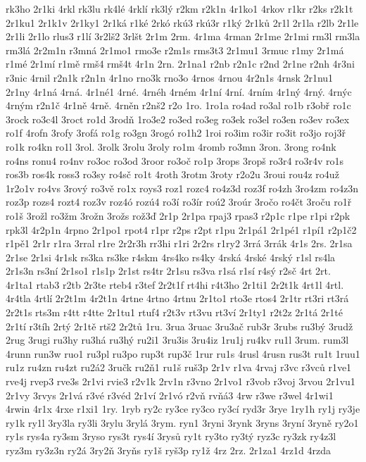 rk3ho
2r1ki
4rkl
rk3lu
rk4lé
4rklí
rk3lý
r2km
r2k1n
4r1ko1
4rkov
r1kr
r2ks
r2k1t
2r1ku1
2r1k1v
2r1ky1
2r1ká
r1ké
2rkó
rkú3
rkú3r
r1ký
2r1ků
2r1l
2r1la
r2lb
2r1le
2r1li
2r1lo
rlus3
r1lí
3r2lš2
3rlšt
2r1m
2rm.
4r1ma
4rman
2r1me
2r1mi
rm3l
rm3la
rm3lá
2r2m1n
r3mná
2r1mo1
rmo3e
r2m1s
rms3t3
2r1mu1
3rmuc
r1my
2r1má
r1mé
2r1mí
r1mě
rmš4
rmš4t
4r1n
2rn.
2r1na1
r2nb
r2n1c
r2nd
2r1ne
r2nh
4r3ni
r3nic
4rnil
r2n1k
r2n1n
4r1no
rno3k
rno3o
4rnos
4rnou
4r2n1s
4rnsk
2r1nu1
2r1ny
4r1ná
4rná.
4r1né1
4rné.
4rnéh
4rném
4r1ní
4rní.
4rním
4r1ný
4rný.
4rnýc
4rným
r2n1č
4r1ně
4rně.
4rněn
r2nš2
r2o
1ro.
1ro1a
ro4ad
ro3al
ro1b
r3obř
ro1c
3rock
ro3c4l
3roct
ro1d
3rodň
1ro3e2
ro3ed
ro3eg
ro3ek
ro3el
ro3en
ro3ev
ro3ex
ro1f
4rofn
3rofy
3rofá
ro1g
ro3gn
3rogó
ro1h2
1roi
ro3im
ro3ir
ro3it
ro3jo
roj3ř
ro1k
ro4kn
ro1l
3rol.
3rolk
3rolu
3roly
ro1m
4romb
ro3mn
3ron.
3rong
ro4nk
ro4ns
ronu4
ro4nv
ro3oc
ro3od
3roor
ro3oč
ro1p
3rops
3ropš
ro3r4
ro3r4v
ro1s
ros3b
ros4k
ross3
ro3sy
ro4sč
ro1t
4roth
3rotm
3roty
r2o2u
3roui
rou4z
ro4už
1r2o1v
ro4vs
3rový
ro3vě
ro1x
roys3
roz1
rozc4
ro4z3d
roz3f
ro4zh
3ro4zm
ro4z3n
roz3p
rozs4
rozt4
roz3v
roz4ó
rozú4
ro3í
ro3ír
roú2
3roúr
3ročo
ro4čt
3roču
ro1ř
ro1š
3rožl
ro3žm
3rožn
3rožs
rož3ď
2r1p
2r1pa
rpaj3
rpas3
r2p1c
r1pe
r1pi
r2pk
rpk3l
4r2p1n
4rpno
2r1po1
rpot4
r1pr
r2ps
r2pt
r1pu
2r1pá1
2r1pé1
r1pí1
r2p1č2
r1pě1
2r1r
r1ra
3rral
r1re
2r2r3h
rr3hi
r1ri
2r2rs
r1ry2
3rrá
3rrák
4r1s
2rs.
2r1sa
2r1se
2r1si
4r1sk
rs3ka
rs3ke
r4skm
4rs4ko
rs4ky
4rská
4rské
4rský
r1sl
rs4la
2r1s3n
rs3ní
2r1so1
r1s1p
2r1st
rs4tr
2r1su
rs3va
r1sá
r1sí
r4sý
r2sč
4rt
2rt.
4r1ta1
rtab3
r2tb
2r3te
rteb4
r3tef
2r2t1f
rt4hi
r4t3ho
2r1ti1
2r2t1k
4rt1l
4rtl.
4r4tla
4rtlí
2r2t1m
4r2t1n
4rtne
4rtno
4rtnu
2r1to1
rto3e
rtos4
2r1tr
rt3ri
rt3rá
2r2t1s
rts3m
r4tt
r4tte
2r1tu1
rtuf4
r2t3v
rt3vu
rt3ví
2r1ty1
r2t2z
2r1tá
2r1té
2r1tí
r3tíh
2rtý
2r1tě
rtš2
2r2tů
1ru.
3rua
3ruac
3ru3ač
rub3r
3rubs
ru3bý
3rudž
2rug
3rugi
ru3hy
ru3há
ru3hý
ru2i1
3ru3is
3ru4iz
1ru1j
ru4kv
ru1l
3rum.
rum3l
4runn
run3w
ruo1
ru3pl
ru3po
rup3t
rup3č
1rur
ru1s
4rusl
4rusn
rus3t
ru1t
1ruu1
ru1z
ru4zn
ru4zt
ru2á2
3ručk
ru2ň1
ru1š
ruš3p
2r1v
r1va
4rvaj
r3vc
r3vců
r1ve1
rve4j
rvep3
rve3s
2r1vi
rvie3
r2v1k
2rv1n
r3vno
2r1vo1
r3vob
r3voj
3rvou
2r1vu1
2r1vy
3rvys
2r1vá
r3vé
r3véd
2r1ví
2r1vó
r2vň
rvňá3
4rw
r3we
r3wel
4r1wi1
4rwin
4r1x
4rxe
r1xi1
1ry.
1ryb
ry2c
ry3ce
ry3co
ry3cí
ryd3r
3rye
1ry1h
ry1j
ry3je
ry1k
ry1l
3ry3la
ry3li
3rylu
3rylá
3rym.
ryn1
3ryni
3rynk
3ryns
3ryní
3ryně
ry2o1
ry1s
rys4a
ry3sm
3ryso
rys3t
rys4í
3rysů
ry1t
ry3to
ry3tý
ryz3c
ry3zk
ry4z3l
ryz3m
ry3z3n
ry2á
3ry2ň
3ryňs
ry1š
ryš3p
ry1ž
4rz
2rz.
2r1za1
4rz1d
4rzda
